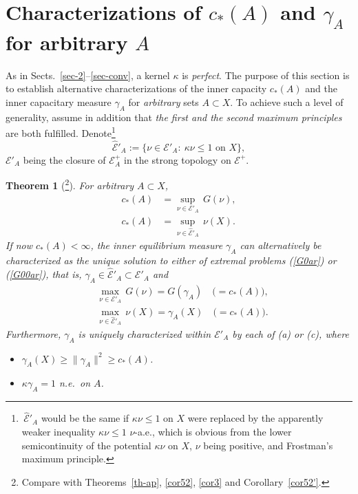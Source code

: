 \documentclass[12pt,a4paper,reqno]{amsart} %
\theoremstyle{lause}
\theoremstyle{maaritelma}
\theoremstyle{lause}
\newtheorem{theorem}{Theorem}[section]
\theoremstyle{maaritelma}
\numberwithin{equation}{section}
\begin{document}
\section{Characterizations of $c_*(A)$ and $\gamma_A$ for arbitrary $A$}\label{sec-cr}

As in Sects.~\ref{sec-2}--\ref{sec-conv}, a kernel $\kappa$ is {\it perfect}. The purpose of this section is to establish alternative characterizations of the inner capacity $c_*(A)$ and the inner capacitary measure $\gamma_A$ for {\it arbitrary\/} sets $A\subset X$.
To achieve such a level of generality, assume in addition that {\it the first and the second maximum principles\/} are both fulfilled. Denote\footnote{\,$\widehat{\mathcal E}'_A$ would be the same if $\kappa\nu\leqslant1$ on $X$ were replaced by the apparently weaker inequality $\kappa\nu\leqslant1$ $\nu$-a.e., which is obvious from the lower semicontinuity of the potential $\kappa\nu$ on $X$, $\nu$ being positive, and Frostman's maximum principle.}
\begin{equation*}\label{QQ}\widehat{\mathcal E}'_A:=\bigl\{\nu\in\mathcal E'_A: \ \kappa\nu\leqslant1\text{\ on $X$}\bigr\},\end{equation*}
$\mathcal E'_A$ being the closure of $\mathcal E^+_A$ in the strong topology on $\mathcal E^+$.

\begin{theorem}[\footnote{Compare with Theorems~\ref{th-ap}, \ref{cor52}, \ref{cor3} and Corollary~\ref{cor52'}.}]\label{G0'ar}For arbitrary\/ $A\subset X$,
\begin{align}\label{G0ar}c_*(A)&=\sup_{\nu\in\mathcal E'_A}\,G(\nu),\\
\label{G00ar}c_*(A)&=\sup_{\nu\in\widehat{\mathcal E}'_A}\,\nu(X).\end{align}
If now\/ $c_*(A)<\infty$, the inner equilibrium measure\/ $\gamma_A$ can alternatively be characterized as the unique solution to either of extremal problems\/ {\rm(\ref{G0ar})} or\/ {\rm(\ref{G00ar})}, that is, $\gamma_A\in\widehat{\mathcal E}'_A\subset\mathcal E'_A$ and
\begin{align}
    &\max_{\nu\in\mathcal E'_A}\,G(\nu)=G(\gamma_A)\quad\bigl({}=c_*(A)\bigr),\label{cl1ar}\\
    &\max_{\nu\in\widehat{\mathcal E}'_A}\,\nu(X)=\gamma_A(X)\quad\bigl({}=c_*(A)\bigr).\label{cl2ar}
  \end{align}
Furthermore, $\gamma_A$ is uniquely characterized within\/ $\mathcal E'_A$ by each of\/ {\rm(a)} or\/ {\rm(c)}, where
\begin{itemize}
\item[{\rm(a)}] $\gamma_A(X)\geqslant\|\gamma_A\|^2\geqslant c_*(A)$.
\item[{\rm(c)}] $\kappa\gamma_A=1$ n.e.\ on\/ $A$.
\end{itemize}
\end{theorem}
\end{document}
